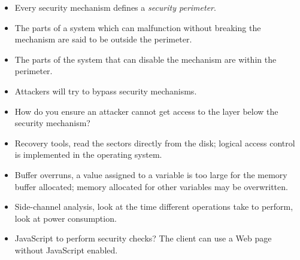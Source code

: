 \documentclass{beamer}
\begin{document}
\begin{frame}
  \begin{itemize}
    \item Every security mechanism defines a \emph{security perimeter}.

    \item The parts of a system which can malfunction without breaking the 
      mechanism are said to be outside the perimeter.

    \item The parts of the system that can disable the mechanism are within the 
      perimeter.
  \end{itemize}
\end{frame}

\begin{frame}
  \begin{itemize}
    \item Attackers will try to bypass security mechanisms.

    \item How do you ensure an attacker cannot get access to the layer below 
      the security mechanism?
  \end{itemize}
\end{frame}

\begin{frame}
  \begin{itemize}
    \item Recovery tools, read the sectors directly from the disk; logical 
      access control is implemented in the operating system.

    \item Buffer overruns, a value assigned to a variable is too large for the 
      memory buffer allocated; memory allocated for other variables may be 
      overwritten.

    \item Side-channel analysis, look at the time different operations take to 
      perform, look at power consumption.

    \item JavaScript to perform security checks?
      The client can use a Web page without JavaScript enabled.

  \end{itemize}
\end{frame}



\begin{frame}[allowframebreaks]
	\small
  \printbibliography{}
\end{frame}
\end{document}
